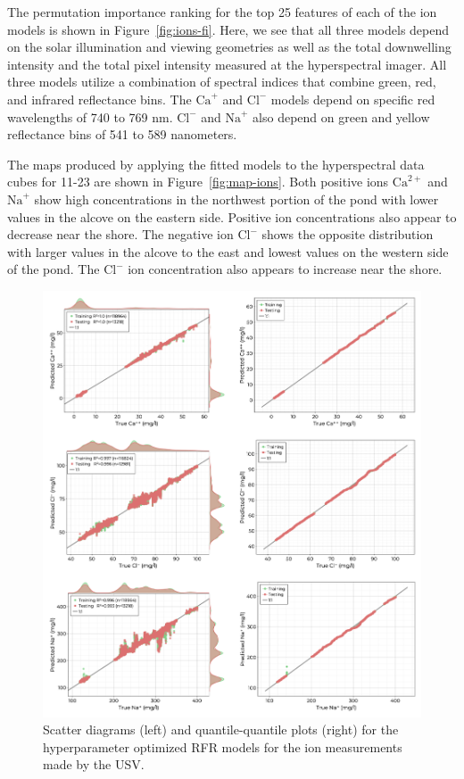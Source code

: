 \documentclass[remotesensing,article,submit,pdftex,moreauthors]{Definitions/mdpi}
\begin{document}
The permutation importance ranking for the top 25 features of each of the ion models is shown in Figure~\ref{fig:ions-fi}. Here, we see that all three models depend on the solar illumination and viewing geometries as well as the total downwelling intensity and the total pixel intensity measured at the hyperspectral imager. All three models utilize a combination of spectral indices that combine green, red, and infrared reflectance bins. The $\textrm{Ca}^{+}$ and $\textrm{Cl}^{-}$ models depend on specific red wavelengths of 740 to 769 nm. $\textrm{Cl}^{-}$ and $\textrm{Na}^{+}$ also depend on green and yellow reflectance bins of 541 to 589 nanometers.

The maps produced by applying the fitted models to the hyperspectral data cubes for 11-23 are shown in Figure~\ref{fig:map-ions}. Both positive ions $\mathrm{Ca}^{2+}$ and $\mathrm{Na}^{+}$ show high concentrations in the northwest portion of the pond with lower values in the alcove on the eastern side. Positive ion concentrations also appear to decrease near the shore. The negative ion $\mathrm{Cl}^{-}$ shows the opposite distribution with larger values in the alcove to the east and lowest values on the western side of the pond. The $\mathrm{Cl}^{-}$ ion concentration also appears to increase near the shore.

\begin{figure}[t!]
\centering
\vspace{-0.3in}
\includegraphics[width=\columnwidth]{paper/figures/results/fits/ions-fitres.png}
\vspace{-0.2in}
\caption{Scatter diagrams (left) and quantile-quantile plots (right) for the hyperparameter optimized RFR models for the ion measurements made by the USV.\label{fig:ions-fit}}
\end{figure}  
\end{document}
